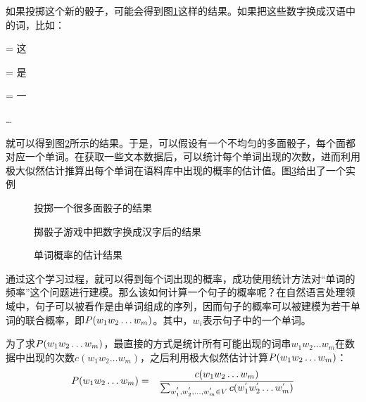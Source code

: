 \parinterval 如果投掷这个新的骰子，可能会得到图\ref{fig:2-7}这样的结果。如果把这些数字换成汉语中的词，比如：
\vspace{0.5em}

\; = \; 这

\; = \; 是

\; = \; 一

\parinterval  \ldots
\vspace{0.5em}

\parinterval 就可以得到图\ref{fig:2-8}所示的结果。于是，可以假设有一个不均匀的多面骰子，每个面都对应一个单词。在获取一些文本数据后，可以统计每个单词出现的次数，进而利用极大似然估计推算出每个单词在语料库中出现的概率的估计值。图\ref{fig:2-9}给出了一个实例

\begin{figure}[htp]
\centering

\caption{投掷一个很多面骰子的结果}
\label{fig:2-7}
\end{figure}

\begin{figure}[htp]
\centering

\setlength{\belowcaptionskip}{-0.2cm}
\caption{掷骰子游戏中把数字换成汉字后的结果}
\label{fig:2-8}
\end{figure}

\begin{figure}[htp]
\centering

\caption{单词概率的估计结果}
\label{fig:2-9}
\end{figure}

\parinterval 通过这个学习过程，就可以得到每个词出现的概率，成功使用统计方法对“单词的频率”这个问题进行建模。那么该如何计算一个句子的概率呢？在自然语言处理领域中，句子可以被看作是由单词组成的序列，因而句子的概率可以被建模为若干单词的联合概率，即${P}(w_1 w_2 \ldots w_m)$。其中，$w_i$表示句子中的一个单词。

\parinterval 为了求${P}(w_1 w_2 \ldots w_m)$，最直接的方式是统计所有可能出现的词串$w_1 w_2 \ldots w_m$在数据中出现的次数$c(w_1 w_2 \ldots w_m)$，之后利用极大似然估计计算${P}(w_1 w_2 \ldots w_m)$：
\begin{eqnarray}
{P}(w_1 w_2 \ldots w_m) & = & \frac{c(w_1 w_2 \ldots w_m)}{\sum_{w^{'}_1, w^{'}_2,...,w^{'}_m \in V} c(w^{'}_1 w^{'}_2 \ldots w^{'}_m)} \label{eq:seq-mle}
\label{eq:2-20}
\end{eqnarray}

